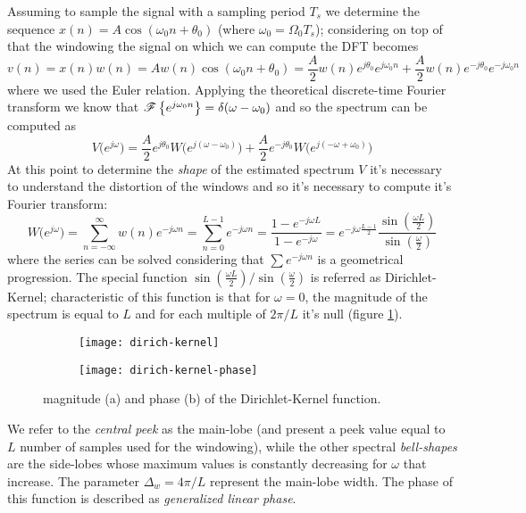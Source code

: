 	Assuming to sample the signal with a sampling period $T_s$ we determine the sequence $x(n) = A \cos(\omega_0n + \theta_0)$ (where $\omega_0 = \Omega_0 T_s$); considering on top of that the windowing the signal on which we can compute the DFT becomes
	\[ v(n) = x(n)w(n) = A w(n) \cos(\omega_0n+\theta_0) = \frac A 2 w(n) e^{j\theta_0} e^{j\omega_0n} +\frac A 2 w(n) e^{-j\theta_0} e^{-j\omega_0n} \]
	where we used the Euler relation. Applying the theoretical discrete-time Fourier transform we know that $\mathscr{F}\left\{ e^{j\omega_0n} \right\} = \delta(\omega-\omega_0)$ and so the spectrum can be computed as
	\[ V\big(e^{j\omega}\big) = \frac A 2 e^{j\theta_0} W\big(e^{j(\omega-\omega_0)}\big) + \frac A 2 e^{-j\theta_0} W\big(e^{j(-\omega+\omega_0)}\big) \]
	At this point to determine the \textit{shape} of the estimated spectrum $V$ it's necessary to understand the distortion of the windows and so it's necessary to compute it's Fourier transform:
	\[ W\big(e^{j\omega}\big) = \sum_{n=-\infty}^{\infty} w(n) e^{-j\omega n} =  \sum_{n=0}^{L-1} e^{ -j\omega n} = \frac{1 - e^{-j\omega L}}{1-e^{-j\omega}} = e^{-j\omega \frac{L-1}{2}} \frac{\sin\left(\frac{\omega L}{2} \right)}{\sin \left( \frac \omega 2 \right)} \]
	where the series can be solved considering that $\sum e^{-j\omega n}$ is a geometrical progression. The special function $\sin\left(\frac{\omega L}{2}\right) / \sin\left(\frac \omega 2\right)$ is referred as Dirichlet-Kernel; characteristic of this function is that for $\omega= 0$, the magnitude of the spectrum is equal to $L$ and for each multiple of $2\pi/L$ it's null (figure \ref{fig:dft:dirich}).
	
	\begin{figure}[bht]
		\begin{subfigure}{0.48\linewidth}
			\centering \texttt{[image: dirich-kernel]} \caption{}
		\end{subfigure}
		\begin{subfigure}{0.48\linewidth}
			\centering \texttt{[image: dirich-kernel-phase]} \caption{}
		\end{subfigure}
		\caption{magnitude (a) and phase (b) of the Dirichlet-Kernel function.}
		\label{fig:dft:dirich}
	\end{figure}
	
	We refer to the \textit{central peek} as the main-lobe (and present a peek value equal to $L$ number of samples used for the windowing), while the other spectral \textit{bell-shapes} are the side-lobes whose maximum values is constantly decreasing for $\omega$ that increase. The parameter $\Delta_w = 4\pi /L$ represent the main-lobe width. The phase of this function is described as \textit{generalized linear phase}. \vspace{3mm}
	
